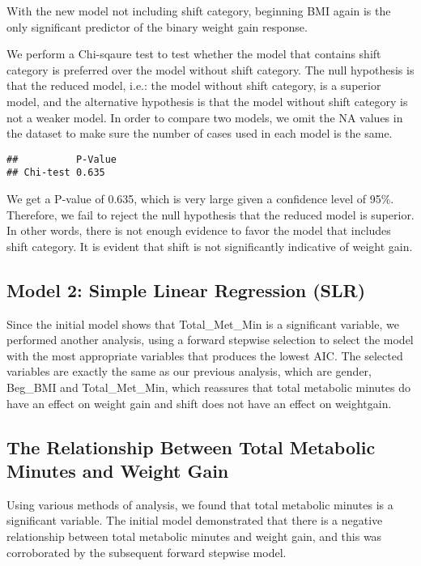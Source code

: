 \documentclass[]{article}
\begin{document}
With the new model not including shift category, beginning BMI again is
the only significant predictor of the binary weight gain response.

We perform a Chi-sqaure test to test whether the model that contains
shift category is preferred over the model without shift category. The
null hypothesis is that the reduced model, i.e.: the model without shift
category, is a superior model, and the alternative hypothesis is that
the model without shift category is not a weaker model. In order to
compare two models, we omit the NA values in the dataset to make sure
the number of cases used in each model is the same.

\begin{verbatim}
##          P-Value
## Chi-test 0.635
\end{verbatim}

We get a P-value of 0.635, which is very large given a confidence level
of 95\%. Therefore, we fail to reject the null hypothesis that the
reduced model is superior. In other words, there is not enough evidence
to favor the model that includes shift category. It is evident that
shift is not significantly indicative of weight gain.

\hypertarget{model-2-simple-linear-regression-slr}{%
\subsection{Model 2: Simple Linear Regression
(SLR)}\label{model-2-simple-linear-regression-slr}}

Since the initial model shows that Total\_Met\_Min is a significant
variable, we performed another analysis, using a forward stepwise
selection to select the model with the most appropriate variables that
produces the lowest AIC. The selected variables are exactly the same as
our previous analysis, which are gender, Beg\_BMI and Total\_Met\_Min,
which reassures that total metabolic minutes do have an effect on weight
gain and shift does not have an effect on weightgain.

\hypertarget{the-relationship-between-total-metabolic-minutes-and-weight-gain}{%
\subsection{The Relationship Between Total Metabolic Minutes and Weight
Gain}\label{the-relationship-between-total-metabolic-minutes-and-weight-gain}}

Using various methods of analysis, we found that total metabolic minutes
is a significant variable. The initial model demonstrated that there is
a negative relationship between total metabolic minutes and weight gain,
and this was corroborated by the subsequent forward stepwise model.
\end{document}
